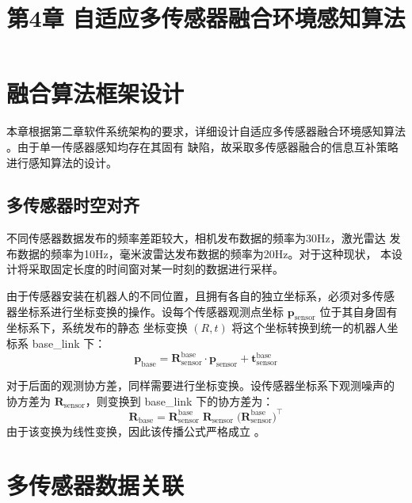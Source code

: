 \documentclass[12pt,a4paper]{ctexart}
\title{第4章 自适应多传感器融合环境感知算法}
\author{}
\date{}
\begin{document}
\maketitle

\section{融合算法框架设计}

本章根据第二章软件系统架构的要求，详细设计自适应多传感器融合环境感知算法
\cite{wang2020fusion}。由于单一传感器感知均存在其固有
缺陷，故采取多传感器融合的信息互补策略进行感知算法的设计。

\subsection{多传感器时空对齐}

不同传感器数据发布的频率差距较大，相机发布数据的频率为30Hz，激光雷达
发布数据的频率为10Hz，毫米波雷达发布数据的频率为20Hz。对于这种现状，
本设计将采取固定长度的时间窗对某一时刻的数据进行采样。

由于传感器安装在机器人的不同位置，且拥有各自的独立坐标系，必须对多传感
器坐标系进行坐标变换的操作。设每个传感器观测点坐标
$\mathbf{p}_{\mathrm{sensor}}$ 位于其自身固有坐标系下，系统发布的静态
坐标变换 $(R,t)$ 将这个坐标转换到统一的机器人坐标系 base\_link 下：
\begin{equation}
\mathbf{p}_{\mathrm{base}} =
\mathbf{R}_{\mathrm{sensor}}^{\mathrm{base}} \cdot
\mathbf{p}_{\mathrm{sensor}} +
\mathbf{t}_{\mathrm{sensor}}^{\mathrm{base}}
\end{equation}

对于后面的观测协方差，同样需要进行坐标变换。设传感器坐标系下观测噪声的
协方差为 $\mathbf{R}_{\mathrm{sensor}}$，则变换到 base\_link 下的协方差为：
\begin{equation}
\mathbf{R}_{\mathrm{base}} =
\mathbf{R}_{\mathrm{sensor}}^{\mathrm{base}} \;
\mathbf{R}_{\mathrm{sensor}} \;
\bigl( \mathbf{R}_{\mathrm{sensor}}^{\mathrm{base}} \bigr)^{\top}
\end{equation}
由于该变换为线性变换，因此该传播公式严格成立
\cite{bar2001estimation}。

\section{多传感器数据关联}
\end{document}
